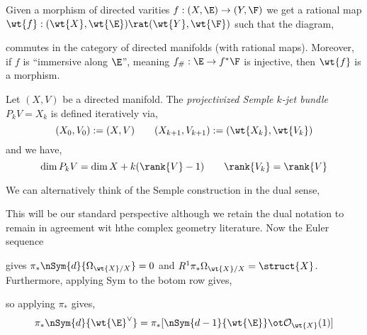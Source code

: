 \documentclass[12pt]{article}
\newcommand{\cO}{\mathcal{O}}
\begin{document}
\begin{prop}
Given a morphism of directed varities $f : (X, \E) \to (Y, \F)$ we get a rational map $\wt{f} : (\wt{X}, \wt{\E}) \rat (\wt{Y}, \wt{\F})$ such that the diagram,
\begin{center}
\end{center} 
commutes in the category of directed manifolds (with rational maps). Moreover, if $f$ is ``immersive along $\E$'', meaning $f_{\#} : \E \to f^* \F$ is injective, then $\wt{f}$ is a morphism.
\end{prop}

\begin{defn}
Let $(X, V)$ be a directed manifold. The \textit{projectivized Semple $k$-jet bundle} $P_k V = X_k$ is defined iteratively via,
\[ (X_0, V_0) := (X, V) \quad \quad (X_{k+1}, V_{k+1}) := (\wt{X_k}, \wt{V_k}) \]
and we have,
\[ \dim{P_k V} = \dim{X} + k (\rank{V} - 1) \quad \quad \rank{V_k} = \rank{V} \]
\end{defn}

\begin{rmk}
We can alternatively think of the Semple construction in the dual sense,
\begin{center}
\end{center}
This will be our standard perspective although we retain the dual notation to remain in agreement wit hthe complex geometry literature. Now the Euler sequence
\begin{center}
\end{center}
gives $\pi_* \nSym{d}{\Omega_{\wt{X}/X}} = 0$ and $R^1 \pi_* \Omega_{\wt{X}/X} = \struct{X}$. Furthermore, applying Sym to the botom row gives,
\begin{center}
\end{center}
so applying $\pi_*$ gives,
\[ \pi_* \nSym{d}{\wt{\E}^\vee} = \pi_* [ \nSym{d-1}{\wt{\E}} \ot \cO_{\wt{X}}(1)] \]
\end{rmk}
\end{document}
